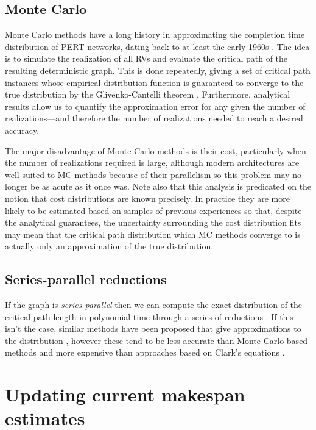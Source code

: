 \documentclass[12pt]{article}
\begin{document}
\subsection{Monte Carlo}
\label{subsect.stochastic_monte_carlo}

Monte Carlo methods have a long history in approximating the completion time distribution of PERT networks, dating back to at least the early 1960s \cite{van63}. The idea is to simulate the realization of all RVs and evaluate the critical path of the resulting deterministic graph. This is done repeatedly, giving a set of critical path instances whose empirical distribution function is guaranteed to converge to the true distribution by the Glivenko-Cantelli theorem \cite{can16}. Furthermore, analytical results allow us to quantify the approximation error for any given the number of realizations---and therefore the number of realizations needed to reach a desired accuracy.

The major disadvantage of Monte Carlo methods is their cost, particularly when the number of realizations required is large, although modern architectures are well-suited to MC methods because of their parallelism so this problem may no longer be as acute as it once was. Note also that this analysis is predicated on the notion that cost distributions are known precisely. In practice they are more likely to be estimated based on samples of previous experiences so that, despite the analytical guarantees, the uncertainty surrounding the cost distribution fits may mean that the critical path distribution which MC methods converge to is actually only an approximation of the true distribution. 

\subsection{Series-parallel reductions}
\label{subsect.stochastic_series_parallel} 

If the graph is {\em series-parallel} then we can compute the exact distribution of the critical path length in polynomial-time through a series of reductions \cite{dod85,mar65}. If this isn't the case, similar methods have been proposed that give approximations to the distribution \cite{dod85,lud01}, however these tend to be less accurate than Monte Carlo-based methods and more expensive than approaches based on Clark's equations \cite{can16}. 

\section{Updating current makespan estimates}
\label{sect.other_updating}
\end{document}
